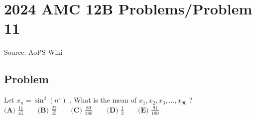 \documentclass[12pt]{article}
\begin{document}
\section*{{2024 AMC 12B Problems/Problem 11}}
Source: AoPS Wiki

\subsection*{Problem}
Let $x_n = \sin^2(n^{\circ})$ . What is the mean of $x_1,x_2,x_3,\dots,x_{90}$ ? $\textbf{(A) } \frac{11}{45} \qquad\textbf{(B) } \frac{22}{45} \qquad\textbf{(C) } \frac{89}{180} \qquad\textbf{(D) } \frac{1}{2} \qquad\textbf{(E) } \frac{91}{180}$
\end{document}
